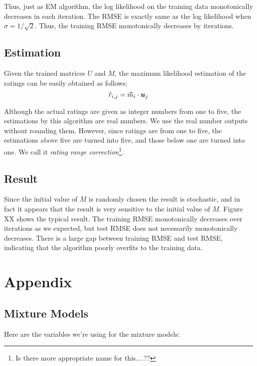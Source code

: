 \documentclass{article}
\newcommand{\vect} [1]{{ \mbox{\boldmath $#1$} }}
\begin{document}
Thus, just as EM algorithm, the log likelihood on the training data monotonically decreases in each iteration. The RMSE is exactly same as the log likelihood when $\sigma = 1/\sqrt{2}$. Thus, the training RMSE monotonically decreases by iterations.

\subsection{Estimation}
Given the trained matrices $U$ and $M$, the maximum likelihood estimation of the ratings can be easily obtained as follows;
\begin{equation}
\hat{r}_{i,j}=\vec{m}_i \cdot {\vect u}_j
\end{equation}

Although the actual ratings are given as integer numbers from one to five, the estimations by this algorithm are real numbers. We use the real number outputs without rounding them. However, since ratings are from one to five, the estimations above five are turned into five, and those below one are turned into one. We call it \textit{rating range correction}\footnote{Is there more appropriate name for this....??}.

\subsection{Result}

Since the initial value of $M$ is randomly chosen the result is stochastic, and in fact it appears that the result is very sensitive to the initial value of $M$. Figure XX shows the typical result. The training RMSE monotonically decreases over iterations as we expected, but test RMSE does not necessarily monotonically decreases. There is a large gap between training RMSE and test RMSE, indicating that the algorithm poorly overfits to the training data.



\section{Appendix}

\subsection{Mixture Models}

Here are the variables we're using for the mixture models:
\end{document}
